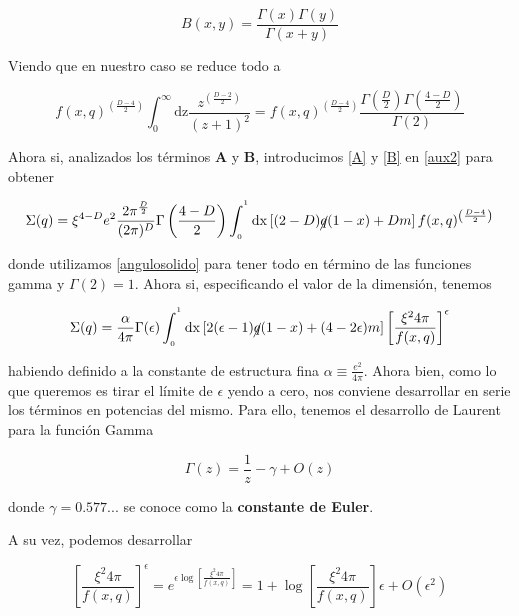 \documentclass{article}
\numberwithin{equation}{section}
\begin{document}
\begin{equation}\label{key}
B(x,y) = \frac{\Gamma(x) \Gamma(y)}{\Gamma(x+y)}
\end{equation}

Viendo que en nuestro caso se reduce todo a

\begin{equation}\label{B}
f(x,q)^{\left(\frac{D-4}{2}\right)} \int_0^{\infty}\mathrm{dz}\frac{z^{\left(\frac{D-2}{2}\right)}}{\left(z + 1\right)^2} = f(x,q)^{\left(\frac{D-4}{2}\right)} \frac{\Gamma(\frac{D}{2}) \Gamma(\frac{4-D}{2})}{\Gamma(2)}
\end{equation}

Ahora si, analizados los términos $ \textbf{A} $ y $ \textbf{B} $, introducimos \ref{A} y \ref{B} en \ref{aux2} para obtener


\begin{equation}
\Sigma(q)=\xi^{4-D} e^{2}\frac{2\pi^{\frac{D}{2}}}{(2\pi)^{D}} \Gamma\left(\frac{4-D}{2}\right)\int_{_{0}}^{^{1}}\mathrm{dx} \left[(2-D)\cancel{q}(1-x)+Dm \right] f(x,q)^{\left(\frac{D-4}{2}\right)}
\end{equation}

donde utilizamos \ref{angulosolido} para tener todo en término de las funciones gamma y $ \Gamma(2)=1 $. Ahora si, especificando el valor de la dimensión, tenemos

\begin{equation}\label{aux3}
\Sigma(q)= \frac{\alpha}{4\pi}\Gamma(\epsilon)\int_{_{0}}^{^{1}}\mathrm{dx} \left[2(\epsilon-1)\cancel{q}(1-x)+(4-2\epsilon)m \right] \left[\frac{\xi^2 4\pi}{f(x,q)}\right]^{\epsilon}
\end{equation}

habiendo definido a la constante de estructura fina $ \alpha\equiv \frac{e^2}{4\pi} $. Ahora bien, como lo que queremos es tirar el límite de $ \epsilon $ yendo a cero, nos conviene desarrollar en serie los términos en potencias del mismo. Para ello, tenemos el desarrollo de Laurent para la función Gamma

\begin{equation}\label{desarrollogamma}
\Gamma(z)=\frac{1}{z} - \gamma + O(z)
\end{equation}

donde $ \gamma = 0.577... $ se conoce como la \textbf{constante de Euler}.

A su vez, podemos desarrollar

\begin{equation}\label{desarrolloexponente}
\left[\frac{\xi^2 4\pi}{f(x,q)}\right]^{\epsilon} = e^{\epsilon \log\left[\frac{\xi^2 4\pi}{f(x,q)}\right]} = 1 + \log\left[\frac{\xi^2 4\pi}{f(x,q)}\right] \epsilon + O(\epsilon^2)
\end{equation}
\end{document}
